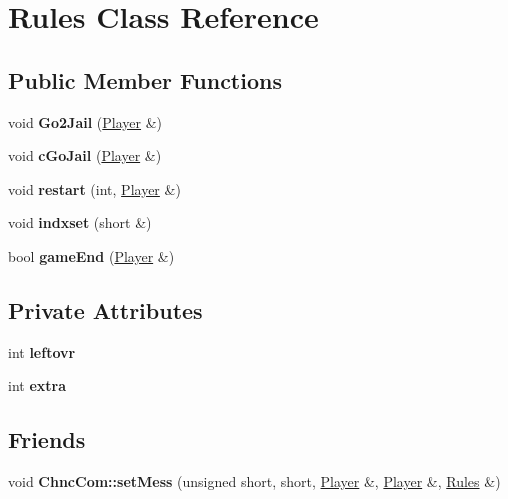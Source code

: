 \hypertarget{class_rules}{}\section{Rules Class Reference}
\label{class_rules}
\subsection*{Public Member Functions}
\begin{DoxyCompactItemize}
\item 
\mbox{\label{class_rules_a7f5e6a12c1b392a9e56d58877c2a46c6}} 
void {\bfseries Go2\+Jail} (\hyperlink{class_player}{Player} \&)
\item 
\mbox{\label{class_rules_a567307b732f394e528383293d91fbde5}} 
void {\bfseries c\+Go\+Jail} (\hyperlink{class_player}{Player} \&)
\item 
\mbox{\label{class_rules_a6377ce4bb12df15cdf914403c3031451}} 
void {\bfseries restart} (int, \hyperlink{class_player}{Player} \&)
\item 
\mbox{\label{class_rules_a8bfdb512617cfa624152232228da73c6}} 
void {\bfseries indxset} (short \&)
\item 
\mbox{\label{class_rules_a5641a3d79e65d103fa9263e4a10f9566}} 
bool {\bfseries game\+End} (\hyperlink{class_player}{Player} \&)
\end{DoxyCompactItemize}
\subsection*{Private Attributes}
\begin{DoxyCompactItemize}
\item 
\mbox{\label{class_rules_a3ee34eda1062303e7c36c71a804b9ded}} 
int {\bfseries leftovr}
\item 
\mbox{\label{class_rules_ad9052569712c9c1b9c25177e58a5e752}} 
int {\bfseries extra}
\end{DoxyCompactItemize}
\subsection*{Friends}
\begin{DoxyCompactItemize}
\item 
\mbox{\label{class_rules_ae6db878679688c4d56ae2e97c86c6725}} 
void {\bfseries Chnc\+Com\+::set\+Mess} (unsigned short, short, \hyperlink{class_player}{Player} \&, \hyperlink{class_player}{Player} \&, \hyperlink{class_rules}{Rules} \&)
\end{DoxyCompactItemize}


